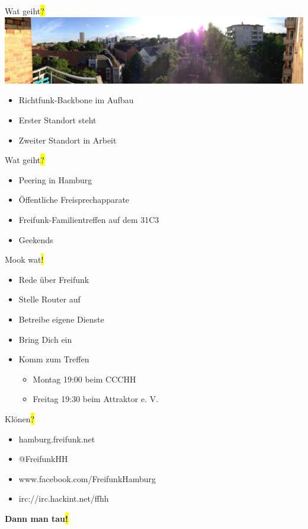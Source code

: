 \documentclass[t]{beamer}
\begin{document}
\begin{frame}{Wat geiht\hl{?}}
    \includegraphics[width=\textwidth]{Bilder/esmarch95}
    
    \begin{itemize}
        \item Richtfunk-Backbone im Aufbau
        \item Erster Standort steht
        \item Zweiter Standort in Arbeit
    \end{itemize}
\end{frame}

\begin{frame}{Wat geiht\hl{?}}
    \begin{itemize}
        \item Peering in Hamburg
        \item Öffentliche Freisprechapparate
        \item Freifunk-Familientreffen auf dem 31C3
        \item Geekends
    \end{itemize}
\end{frame}

\begin{frame}{Mook wat\hl{!}}
    \begin{itemize}
        \item Rede über Freifunk
        \item Stelle Router auf
        \item Betreibe eigene Dienste
        \item Bring Dich ein
        \item Komm zum Treffen
        \begin{itemize}
            \item Montag 19:00 beim CCCHH
            \item Freitag 19:30 beim Attraktor e. V.
        \end{itemize}
    \end{itemize}
\end{frame}

\begin{frame}{Klönen\hl{?}}
    \begin{itemize}
        \item hamburg.freifunk.net
        \item @FreifunkHH
        \item www.facebook.com/FreifunkHamburg
        \item irc://irc.hackint.net/ffhh
    \end{itemize}
\end{frame}

\begin{frame}{}
    \vspace{1.6cm}
    \centering 
    \vspace{0.8cm}

    {\Huge\bf Dann man tau\hl{!}}
\end{frame}
\end{document}
